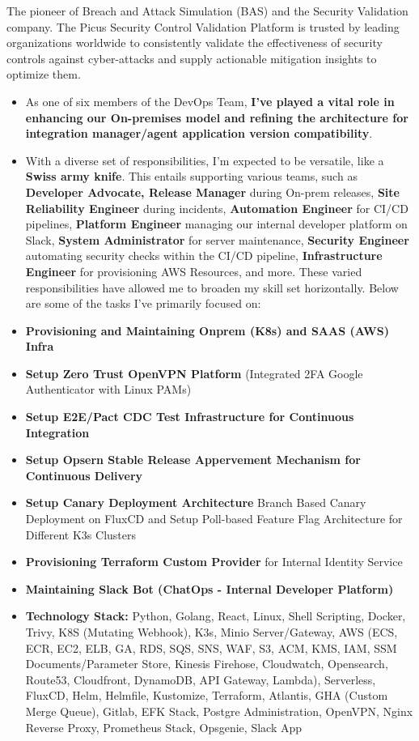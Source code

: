 \documentclass[a4paper,10pt]{article}
\newcommand{\resumeItem}[2]{
  \item \textbf{#1}{ #2 \vspace{-2pt}}
}
\newcommand{\resumeSubItem}[2]{\resumeItem{#1}{#2}\vspace{+1pt}}
\begin{document}
\begin{itemize}[leftmargin=0.5cm]
        {The pioneer of Breach and Attack Simulation (BAS) and the Security Validation company. The Picus Security Control Validation Platform is trusted by leading organizations worldwide to consistently validate the effectiveness of security controls against cyber-attacks and supply actionable mitigation insights to optimize them.}
        \begin{itemize}
            \resumeSubItem{}{As one of six members of the DevOps Team, \textbf{I've played a vital role in enhancing our On-premises model and refining the architecture for integration manager/agent application version compatibility}.}
            \resumeSubItem{}{With a diverse set of responsibilities, I'm expected to be versatile, like a \textbf{Swiss army knife}. This entails supporting various teams, such as \textbf{Developer Advocate, Release Manager} during On-prem releases, \textbf{Site Reliability Engineer} during incidents, \textbf{Automation Engineer} for CI/CD pipelines, \textbf{Platform Engineer} managing our internal developer platform on Slack, \textbf{System Administrator} for server maintenance, \textbf{Security Engineer} automating security checks within the CI/CD pipeline, \textbf{Infrastructure Engineer} for provisioning AWS Resources, and more. These varied responsibilities have allowed me to broaden my skill set horizontally. Below are some of the tasks I've primarily focused on:}
            \resumeSubItem{Provisioning and Maintaining Onprem (K8s) and SAAS (AWS) Infra}{}
            \resumeSubItem{Setup Zero Trust OpenVPN Platform}{(Integrated 2FA Google Authenticator with Linux PAMs)}
            \resumeSubItem{Setup E2E/Pact CDC Test Infrastructure for Continuous Integration}{}
            \resumeSubItem{Setup Opsern Stable Release Appervement Mechanism for Continuous Delivery}{}
            \resumeSubItem{Setup Canary Deployment Architecture}{Branch Based Canary Deployment on FluxCD and Setup Poll-based Feature Flag Architecture for Different K3s Clusters}
            \resumeSubItem{Provisioning Terraform Custom Provider}{for Internal Identity Service}
            \resumeSubItem{Maintaining Slack Bot (ChatOps - Internal Developer Platform)}{}
            \resumeItem{Technology Stack:}{Python, Golang, React, Linux, Shell Scripting, Docker, Trivy, K8S (Mutating Webhook), K3s, Minio Server/Gateway, AWS (ECS, ECR, EC2, ELB, GA, RDS, SQS, SNS, WAF, S3, ACM, KMS, IAM, SSM Documents/Parameter Store, Kinesis Firehose, Cloudwatch, Opensearch, Route53, Cloudfront, DynamoDB, API Gateway, Lambda), Serverless, FluxCD, Helm, Helmfile, Kustomize, Terraform, Atlantis, GHA (Custom Merge Queue), Gitlab, EFK Stack, Postgre Administration, OpenVPN, Nginx Reverse Proxy, Prometheus Stack, Opsgenie, Slack App}
        \end{itemize}


\end{itemize}
\end{document}
